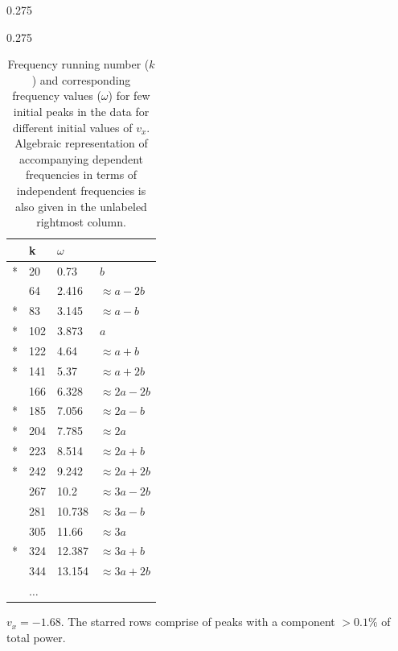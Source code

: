\documentclass[a4paper]{article}
\begin{document}
\begin{table}
\begin{subtable} [h] {0.275\linewidth}
				\label{table:task2_2}
			\end{subtable}
			\hspace{0.05\linewidth}
			\begin{subtable} [h] {0.275\linewidth}
				\centering
				\begin{tabular} {l l l l}
					\toprule
					& \textbf{k} & \textbf{\(\omega\)} &  \\
					\midrule
					* & 20 & 0.73 & \(b\) \\
					& 64 & 2.416 & \(\approx a-2b\) \\
					* & 83 & 3.145 & \(\approx a-b\) \\
					* & 102 & 3.873 & \(a\) \\
					* & 122 & 4.64 & \(\approx a+b\) \\
					* & 141 & 5.37 & \(\approx a+2b\) \\
					& 166 & 6.328 & \(\approx 2a-2b\) \\
					* & 185 & 7.056 & \(\approx 2a-b\) \\
					* & 204 & 7.785 & \(\approx 2a\) \\
					* & 223 & 8.514 & \(\approx 2a+b\) \\
					* & 242 & 9.242 & \(\approx 2a+2b\) \\
					& 267 & 10.2 & \(\approx 3a-2b\) \\          
					& 281 & 10.738 & \(\approx 3a-b\) \\ 
					& 305 & 11.66 & \(\approx 3a\) \\
					* & 324 & 12.387 & \(\approx 3a+b\) \\
					& 344 & 13.154 & \(\approx 3a+2b\) \\
					& \(\dots\) &  & \\
					\bottomrule
				\end{tabular}
				\caption{\(v_x = -1.68\). The starred rows comprise of peaks with a component \(>0.1\%\) of total power.}
				\label{table:task2_3}
			\end{subtable}
			\caption{Frequency running number (\(k\)) and corresponding frequency values (\(\omega\)) for few initial peaks in the data for different initial values of \(v_x\). Algebraic representation of accompanying dependent frequencies in terms of independent frequencies is also given in the unlabeled rightmost column.}
			\label{table:task2_1-3}
		\end{table}
	
\end{document}
